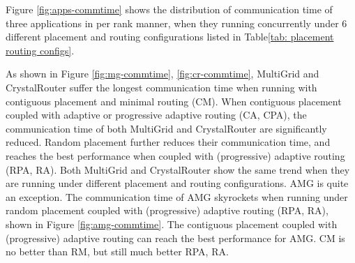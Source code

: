 \documentclass[conference,compsoc]{IEEEtran}
\begin{document}
Figure \ref{fig:apps-commtime} shows the distribution of communication time of three applications in per rank manner, when they running concurrently under 6 different placement and routing configurations listed in Table\ref{tab: placement routing configs}.

As shown in Figure \ref{fig:mg-commtime}, \ref{fig:cr-commtime}, MultiGrid and CrystalRouter suffer the longest communication time when running with contiguous placement and minimal routing (CM). When contiguous placement coupled with adaptive or progressive adaptive routing (CA, CPA), the communication time of both MultiGrid and CrystalRouter are significantly reduced. Random placement further reduces their communication time, and reaches the best performance when coupled with (progressive) adaptive routing (RPA, RA). Both MultiGrid and CrystalRouter show the same trend when they are running under different placement and routing configurations. AMG is quite an exception. The communication time of AMG skyrockets when running under random placement coupled with (progressive) adaptive routing (RPA, RA), shown in Figure \ref{fig:amg-commtime}. The contiguous placement coupled with (progressive) adaptive routing can reach the best performance for AMG. CM is no better than RM, but still much better RPA, RA. 
\end{document}
